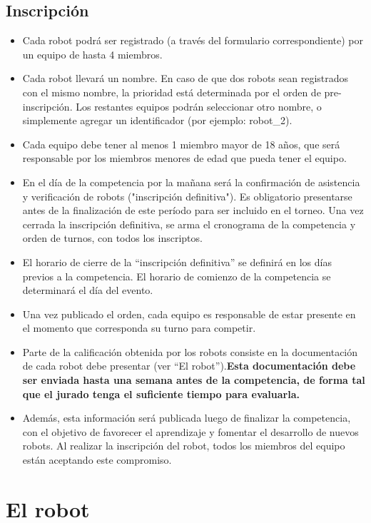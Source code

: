 \documentclass[a4paper,11pt]{article}
\begin{document}
\subsection*{Inscripción}
\begin{itemize}
  \item Cada robot podrá ser registrado (a través del formulario correspondiente) por un equipo de hasta 4 miembros.
  \item Cada robot llevará un nombre. En caso de que dos robots sean registrados con el mismo nombre, la prioridad está determinada por el orden de pre-inscripción. Los restantes equipos podrán seleccionar otro nombre, o simplemente agregar un identificador (por ejemplo: robot\_2).
  \item Cada equipo debe tener al menos 1 miembro mayor de 18 años, que será responsable por los miembros menores de edad que pueda tener el equipo.
  \item En el día de la competencia por la mañana será la confirmación de asistencia y verificación de robots ("inscripción definitiva"). Es obligatorio presentarse antes de la finalización de este período para ser incluido en el torneo. Una vez cerrada la inscripción definitiva, se arma el cronograma de la competencia y orden de turnos, con todos los inscriptos.
  \item El horario de cierre de la ``inscripción definitiva'' se definirá en los días previos a la competencia. El horario de comienzo de la competencia se determinará el día del evento.
  \item Una vez publicado el orden, cada equipo es responsable de estar presente en el momento que corresponda su turno para competir.
  \item Parte de la calificación obtenida por los robots consiste en la documentación de cada robot debe presentar (ver ``El robot'').\textbf{Esta documentación debe ser enviada hasta una semana antes de la competencia, de forma tal que el jurado tenga el suficiente tiempo para evaluarla.}
  \item Además, esta información será publicada luego de finalizar la competencia, con el objetivo de favorecer el aprendizaje y fomentar el desarrollo de nuevos robots. Al realizar la inscripción del robot, todos los miembros del equipo están aceptando este compromiso.
\end{itemize}

\section*{El robot}
\end{document}
